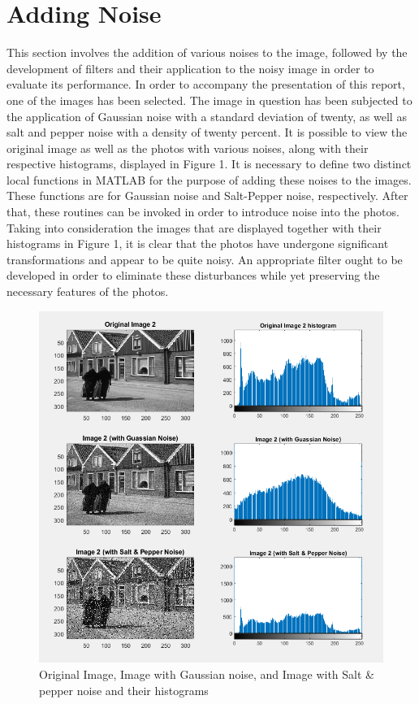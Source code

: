 \section{Adding Noise}\label{P1}

This section involves the addition of various noises to the image, 
followed by the development of filters and their application to the noisy image 
in order to evaluate its performance. In order to accompany the presentation of this report, 
one of the images has been selected. 
The image in question has been subjected to the application of Gaussian noise with 
a standard deviation of twenty, as well as salt and pepper noise with a density of twenty percent. 
It is possible to view the original image as well as the photos with various noises, along with 
their respective histograms, displayed in Figure 1. 
It is necessary to define two distinct local functions in MATLAB for the purpose of adding 
these noises to the images. These functions are for Gaussian noise and Salt-Pepper noise, 
respectively. After that, these routines can be invoked in order to introduce noise 
into the photos.
Taking into consideration the images that are displayed together with their histograms 
in Figure 1, it is clear that the photos have undergone significant transformations and 
appear to be quite noisy. An appropriate filter ought to be developed in order to eliminate 
these disturbances while yet preserving the necessary features of the photos.

\begin{figure} [ht]
    \centering
    \includegraphics[width = \textwidth]{Resources/Images_Org_Nosied.png}
    \caption{Original Image, Image with Gaussian noise, and Image with Salt \& pepper noise and their histograms}
    \label{fig:Original and noise image}
\end{figure}